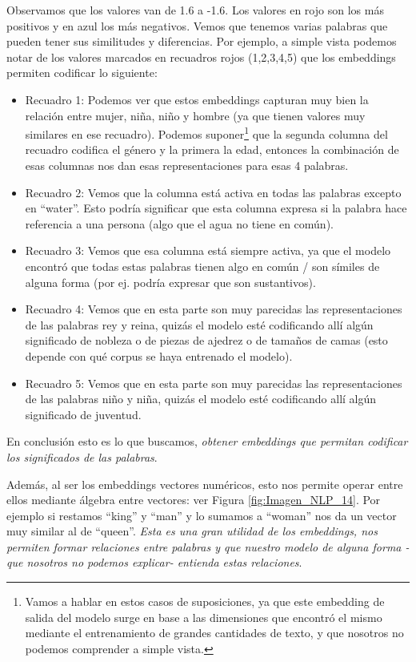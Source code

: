 \documentclass[12pt,a4paper]{article}
\begin{document}
\begin{sloppypar}
Observamos que los valores van de 1.6 a -1.6. Los valores en rojo son los más positivos y en azul los más negativos. Vemos que tenemos varias palabras que pueden tener sus similitudes y diferencias. Por ejemplo, a simple vista podemos notar de los valores marcados en recuadros rojos (1,2,3,4,5) que los embeddings permiten codificar lo siguiente:
\begin{itemize}
\item Recuadro 1: Podemos ver que estos embeddings capturan muy bien la relación entre mujer, niña, niño y hombre (ya que tienen valores muy similares en ese recuadro). Podemos suponer\footnote{Vamos a hablar en estos casos de suposiciones, ya que este embedding de salida del modelo surge en base a las dimensiones que encontró el mismo mediante el entrenamiento de grandes cantidades de texto, y que nosotros no podemos comprender a simple vista.} que la segunda columna del recuadro codifica el género y la primera la edad, entonces la combinación de esas columnas nos dan esas representaciones para esas 4 palabras. 
\item Recuadro 2: Vemos que la columna está activa en todas las palabras excepto en “water”. Esto podría significar que esta columna expresa si la palabra hace referencia a una persona (algo que el agua no tiene en común).
\item Recuadro 3: Vemos que esa columna está siempre activa, ya que el modelo encontró que todas estas palabras tienen algo en común / son símiles de alguna forma (por ej. podría expresar que son sustantivos). 
\item Recuadro 4: Vemos que en esta parte son muy parecidas las representaciones de las palabras rey y reina, quizás el modelo esté codificando allí algún significado de nobleza o de piezas de ajedrez o de tamaños de camas (esto depende con qué corpus se haya entrenado el modelo). 
\item Recuadro 5: Vemos que en esta parte son muy parecidas las representaciones de las palabras niño y niña, quizás el modelo esté codificando allí algún significado de juventud. 
\end{itemize}
En conclusión esto es lo que buscamos, \textit{obtener embeddings que permitan codificar los significados de las palabras}.

Además, al ser los embeddings vectores numéricos, esto nos permite operar entre ellos mediante álgebra entre vectores: ver Figura \ref{fig:Imagen_NLP_14}. Por ejemplo si restamos “king” y “man” y lo sumamos a “woman” nos da un vector muy similar al de “queen”. \textit{Esta es una gran utilidad de los embeddings, nos permiten formar relaciones entre palabras y que nuestro modelo de alguna forma -que nosotros no podemos explicar- entienda estas relaciones}.


\end{sloppypar}
\end{document}
